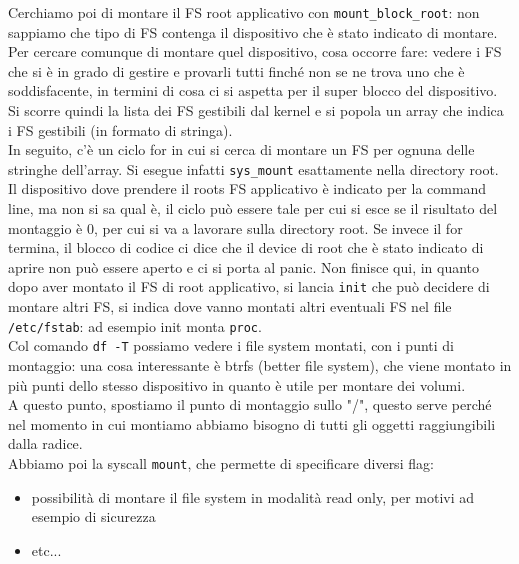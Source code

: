 \documentclass[12pt, oneside]{extbook}
\begin{document}
Cerchiamo poi di montare il FS root applicativo con \texttt{mount\_block\_root}: non sappiamo che tipo di FS contenga il dispositivo che è stato indicato di montare. Per cercare comunque di montare quel dispositivo, cosa occorre fare: vedere i FS che si è in grado di gestire e provarli tutti finché non se ne trova uno che è soddisfacente, in termini di cosa ci si aspetta per il super blocco del dispositivo. Si scorre quindi la lista dei FS gestibili dal kernel e si popola un array che indica i FS gestibili (in formato di stringa).\\In seguito, c'è un ciclo for in cui si cerca di montare un FS per ognuna delle stringhe dell'array. Si esegue infatti \texttt{sys\_mount} esattamente nella directory root.\\Il dispositivo dove prendere il roots FS applicativo è indicato per la command line, ma non si sa qual è, il ciclo può essere tale per cui si esce se il risultato del montaggio è 0, per cui si va a lavorare sulla directory root. Se invece il for termina, il blocco di codice ci dice che il device di root che è stato indicato di aprire non può essere aperto e ci si porta al panic. Non finisce qui, in quanto dopo aver montato il FS di root applicativo, si lancia \texttt{init} che può decidere di montare altri FS, si indica dove vanno montati altri eventuali FS nel file \texttt{/etc/fstab}: ad esempio init monta \texttt{proc}.\\Col comando \texttt{df -T} possiamo vedere i file system montati, con i punti di montaggio: una cosa interessante è btrfs (better file system), che viene montato in più punti dello stesso dispositivo in quanto è utile per montare dei volumi.\\A questo punto, spostiamo il punto di montaggio sullo "/", questo serve perché nel momento in cui montiamo abbiamo bisogno di tutti gli oggetti raggiungibili dalla radice.\\Abbiamo poi la syscall \texttt{mount}, che permette di specificare diversi flag:
\begin{itemize}
	\item possibilità di montare il file system in modalità read only, per motivi ad esempio di sicurezza
	\item etc...
\end{itemize}
\end{document}
